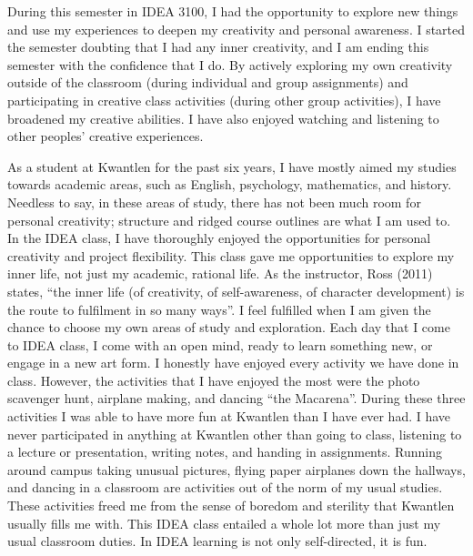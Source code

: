 \documentclass[letterpaper,10pt,headsepline]{scrreprt}
\begin{document}
During this semester in IDEA 3100, I had the opportunity to explore new things and use my experiences to deepen my creativity and personal awareness. I started the semester doubting that I had any inner creativity, and I am ending this semester with the confidence that I do. By actively exploring my own creativity outside of the classroom (during individual and group assignments) and participating in creative class activities (during other group activities), I have broadened my creative abilities. I have also enjoyed watching and listening to other peoples’ creative experiences.

As a student at Kwantlen for the past six years, I have mostly aimed my studies towards academic areas, such as English, psychology, mathematics, and history. Needless to say, in these areas of study, there has not been much room for personal creativity; structure and ridged course outlines are what I am used to. In the IDEA class, I have thoroughly enjoyed the opportunities for personal creativity and project flexibility. This class gave me opportunities to explore my inner life, not just my academic, rational life. As the instructor, Ross (2011) states, “the inner life (of creativity, of self-awareness, of character development) is the route to fulfilment in so many ways”. I feel fulfilled when I am given the chance to choose my own areas of study and exploration. Each day that I come to IDEA class, I come with an open mind, ready to learn something new, or engage in a new art form. I honestly have enjoyed every activity we have done in class. However, the activities that I have enjoyed the most were the photo scavenger hunt, airplane making, and dancing “the Macarena”. During these three activities I was able to have more fun at Kwantlen than I have ever had. I have never participated in anything at Kwantlen other than going to class, listening to a lecture or presentation, writing notes, and handing in assignments. Running around campus taking unusual pictures, flying paper airplanes down the hallways, and dancing in a classroom are activities out of the norm of my usual studies. These activities freed me from the sense of boredom and sterility that Kwantlen usually fills me with. This IDEA class entailed a whole lot more than just my usual classroom duties. In IDEA learning is not only self-directed, it is fun.
\end{document}
